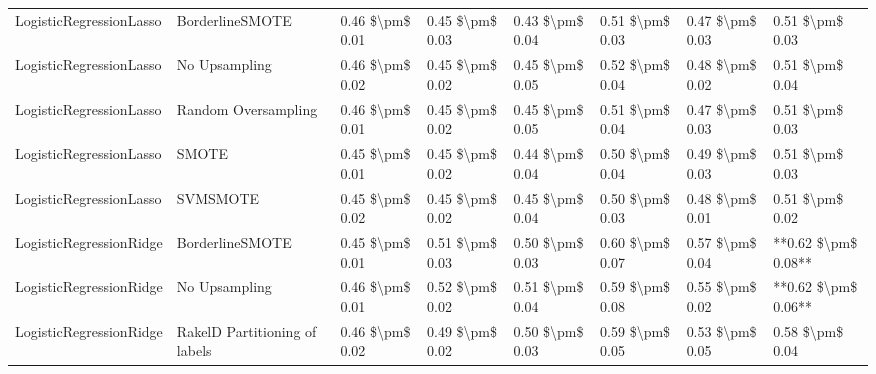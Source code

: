 \begin{tabular}{llllllll}
        LogisticRegressionLasso &               BorderlineSMOTE & 0.46 \$\textbackslash pm\$ 0.01 &           0.45 \$\textbackslash pm\$ 0.03 &       0.43 \$\textbackslash pm\$ 0.04 &        0.51 \$\textbackslash pm\$ 0.03 &                         0.47 \$\textbackslash pm\$ 0.03 &     0.51 \$\textbackslash pm\$ 0.03 \\
        LogisticRegressionLasso &                 No Upsampling & 0.46 \$\textbackslash pm\$ 0.02 &           0.45 \$\textbackslash pm\$ 0.02 &       0.45 \$\textbackslash pm\$ 0.05 &        0.52 \$\textbackslash pm\$ 0.04 &                         0.48 \$\textbackslash pm\$ 0.02 &     0.51 \$\textbackslash pm\$ 0.04 \\
        LogisticRegressionLasso &           Random Oversampling & 0.46 \$\textbackslash pm\$ 0.01 &           0.45 \$\textbackslash pm\$ 0.02 &       0.45 \$\textbackslash pm\$ 0.05 &        0.51 \$\textbackslash pm\$ 0.04 &                         0.47 \$\textbackslash pm\$ 0.03 &     0.51 \$\textbackslash pm\$ 0.03 \\
        LogisticRegressionLasso &                         SMOTE & 0.45 \$\textbackslash pm\$ 0.01 &           0.45 \$\textbackslash pm\$ 0.02 &       0.44 \$\textbackslash pm\$ 0.04 &        0.50 \$\textbackslash pm\$ 0.04 &                         0.49 \$\textbackslash pm\$ 0.03 &     0.51 \$\textbackslash pm\$ 0.03 \\
        LogisticRegressionLasso &                      SVMSMOTE & 0.45 \$\textbackslash pm\$ 0.02 &           0.45 \$\textbackslash pm\$ 0.02 &       0.45 \$\textbackslash pm\$ 0.04 &        0.50 \$\textbackslash pm\$ 0.03 &                         0.48 \$\textbackslash pm\$ 0.01 &     0.51 \$\textbackslash pm\$ 0.02 \\
        LogisticRegressionRidge &               BorderlineSMOTE & 0.45 \$\textbackslash pm\$ 0.01 &           0.51 \$\textbackslash pm\$ 0.03 &       0.50 \$\textbackslash pm\$ 0.03 &        0.60 \$\textbackslash pm\$ 0.07 &                         0.57 \$\textbackslash pm\$ 0.04 & **0.62 \$\textbackslash pm\$ 0.08** \\
        LogisticRegressionRidge &                 No Upsampling & 0.46 \$\textbackslash pm\$ 0.01 &           0.52 \$\textbackslash pm\$ 0.02 &       0.51 \$\textbackslash pm\$ 0.04 &        0.59 \$\textbackslash pm\$ 0.08 &                         0.55 \$\textbackslash pm\$ 0.02 & **0.62 \$\textbackslash pm\$ 0.06** \\
        LogisticRegressionRidge & RakelD Partitioning of labels & 0.46 \$\textbackslash pm\$ 0.02 &           0.49 \$\textbackslash pm\$ 0.02 &       0.50 \$\textbackslash pm\$ 0.03 &        0.59 \$\textbackslash pm\$ 0.05 &                         0.53 \$\textbackslash pm\$ 0.05 &     0.58 \$\textbackslash pm\$ 0.04 \\

\end{tabular}
